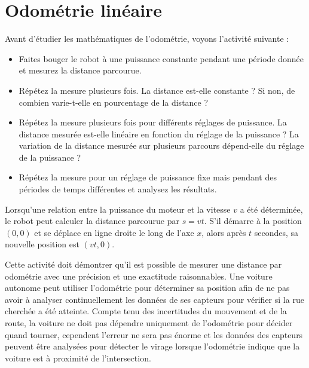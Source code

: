 \section{Odométrie linéaire}

Avant d'étudier les mathématiques de l'odométrie, voyons l'activité suivante :

\begin{framed}
\begin{itemize}
\item Faites bouger le robot à une puissance constante pendant une période donnée et mesurez la distance parcourue.
\item Répétez la mesure plusieurs fois. La distance est-elle constante ? Si non, de combien varie-t-elle en pourcentage de la distance ?
\item Répétez la mesure plusieurs fois pour différents réglages de puissance. La distance mesurée est-elle linéaire en fonction du réglage de la puissance ? La variation de la distance mesurée sur plusieurs parcours dépend-elle du réglage de la puissance ?
\item Répétez la mesure pour un réglage de puissance fixe mais pendant des périodes de temps différentes et analysez les résultats.
\end{itemize}
\end{framed}

Lorsqu'une relation entre la puissance du moteur et la vitesse $v$ a été déterminée, le robot peut calculer la distance parcourue par $s=vt$. S'il démarre à la position $(0,0)$ et se déplace en ligne droite le long de l'axe $x$, alors après $t$ secondes, sa nouvelle position est $(vt,0)$.

Cette activité doit démontrer qu'il est possible de mesurer une distance par odométrie avec une précision et une exactitude raisonnables. Une voiture autonome peut utiliser l'odométrie pour déterminer sa position afin de ne pas avoir à analyser continuellement les données de ses capteurs pour vérifier si la rue cherchée a été atteinte. Compte tenu des incertitudes du mouvement et de la route, la voiture ne doit pas dépendre uniquement de l'odométrie pour décider quand tourner, cependent l'erreur ne sera pas énorme et les données des capteurs peuvent être analysées pour détecter le virage lorsque l'odométrie indique que la voiture est à proximité de l'intersection.

